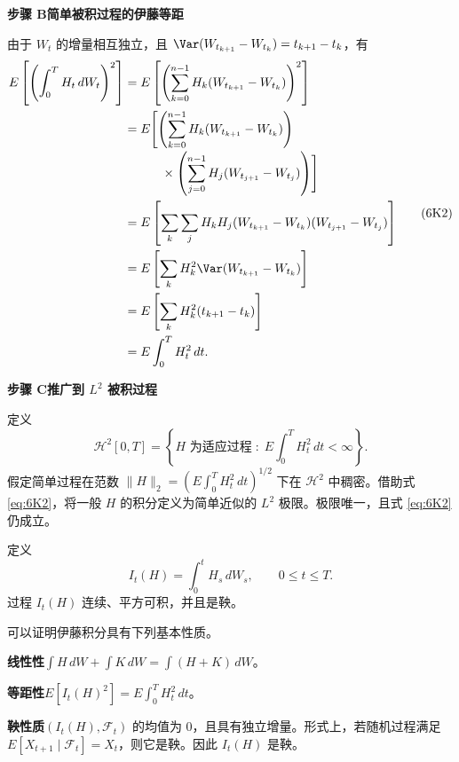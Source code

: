 \textbf{步骤 B\quad 简单被积过程的伊藤等距}\par
由于 $W_t$ 的增量相互独立，且 $\Var(W_{t_{k+1}}-W_{t_k})=t_{k+1}-t_k$，有
\begin{equation*}
  \begin{aligned}
  E\left[\left(\int_0^T H_t\,dW_t\right)^2\right]
   &=E\left[\left(\sum_{k=0}^{n-1}H_k(W_{t_{k+1}}-W_{t_k})\right)^2\right]\\
   &=E\Biggl[\left(\sum_{k=0}^{n-1}H_k(W_{t_{k+1}}-W_{t_k})\right)\\[-2pt]
   &\qquad\quad{}\times\left(\sum_{j=0}^{n-1}H_j(W_{t_{j+1}}-W_{t_j})\right)\Biggr]\\
   &=E\left[\sum_k\sum_j H_k H_j(W_{t_{k+1}}-W_{t_k})
                               (W_{t_{j+1}}-W_{t_j})\right]\\
   &=E\left[\sum_k H_k^2\Var(W_{t_{k+1}}-W_{t_k})\right]\\
   &=E\left[\sum_k H_k^2(t_{k+1}-t_k)\right]\\
   &=E\int_0^T H_t^2\,dt.
  \end{aligned}
  \tag{6K2}\label{eq:6K2}
\end{equation*}

\textbf{步骤 C\quad 推广到 $L^2$ 被积过程}\par
定义
\[
  \mathcal H^2[0,T]=
  \left\{H\text{ 为适应过程}\;:\;E\int_0^T H_t^2\,dt<\infty\right\}.
\]
假定简单过程在范数 $\lVert H\rVert_2=(E\int_0^T H_t^2\,dt)^{1/2}$ 下在 $\mathcal H^2$ 中稠密。借助式 \eqref{eq:6K2}，将一般 $H$ 的积分定义为简单近似的 $L^2$ 极限。极限唯一，且式 \eqref{eq:6K2} 仍成立。

定义
\[
  I_t(H)=\int_0^t H_s\,dW_s,\qquad 0\leq t\leq T.
\]
过程 $I_t(H)$ 连续、平方可积，并且是鞅。


可以证明伊藤积分具有下列基本性质。

\textbf{线性性}\quad $\int H\,dW+\int K\,dW=\int(H+K)\,dW$。

\textbf{等距性}\quad $\displaystyle E[I_t(H)^2]=E\int_0^T H_t^2\,dt$。

\textbf{鞅性质}\quad $(I_t(H),\mathcal F_t)$ 的均值为 0，且具有独立增量。形式上，若随机过程满足 $E[X_{t+1}\mid\mathcal F_t]=X_t$，则它是鞅。因此 $I_t(H)$ 是鞅。

